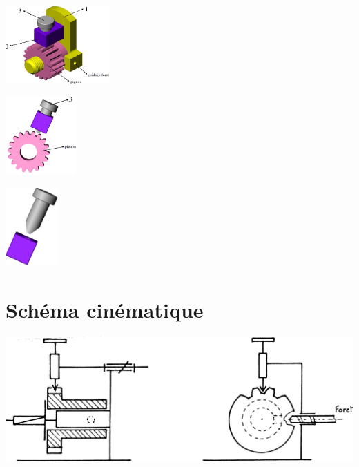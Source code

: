 \documentclass[11pt,oneside]{article}
\begin{document}
\begin{minipage}[c]{.3\linewidth}
\begin{center}
\includegraphics[height=3cm]{png/img1}
\end{center}
\end{minipage}\hfill
\begin{minipage}[c]{.3\linewidth}
\begin{center}
\includegraphics[height=3cm]{png/img2}
\end{center}
\end{minipage}\hfill
\begin{minipage}[c]{.3\linewidth}
\begin{center}
\includegraphics[height=3cm]{png/img3}
\end{center}
\end{minipage}


\section*{Schéma cinématique}


\begin{center}
\includegraphics[width=.8\textwidth]{png/img4}
\end{center}
\end{document}
